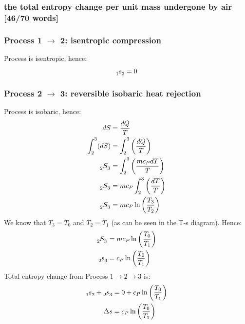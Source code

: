 \documentclass[12pt]{article}
\numberwithin{equation}{section}
\begin{document}
\begin{flushleft}
\subsubsection[Entropy change.]{the total entropy change per unit mass undergone by air [46/70 words]}
\subsubsection*{Process 1 $\rightarrow$ 2: isentropic compression}
Process is isentropic, hence:
\begin{equation}
  \tensor[_1]{s}{_2} = 0
\end{equation}
\subsubsection*{Process 2 $\rightarrow$ 3: reversible isobaric heat rejection}
Process is isobaric, hence:
\begin{align}
  dS &= \frac{dQ}{T}\\
  \int_2^3 (dS) &= \int_2^3 \left(\frac{dQ}{T} \right)\\
  \tensor[_2]{S}{_3} &= \int_2^3 \left(\frac{mc_PdT}{T}\right)\\
  \tensor[_2]{S}{_3} &= mc_P\int_2^3 \left(\frac{dT}{T}\right)\\
  \tensor[_2]{S}{_3} &= mc_P \ln \left( \frac{T_3}{T_2} \right)
\end{align}
We know that $T_3 = T_0$ and $T_2 = T_1$ (as can be seen in the T-s diagram). Hence:
\begin{align}
  \tensor[_2]{S}{_3} &= mc_P \ln \left( \frac{T_0}{T_1} \right)\\
  \tensor[_2]{s}{_3} &= c_P \ln \left( \frac{T_0}{T_1} \right)
\end{align}
Total entropy change from Process $1 \rightarrow 2 \rightarrow 3$ is:
\begin{align}
  \tensor[_1]{s}{_2} + \tensor[_2]{s}{_3} &= 0 + c_P \ln \left( \frac{T_0}{T_1} \right)\\
  \Delta s &= c_P \ln \left( \frac{T_0}{T_1} \right)
\end{align}


\end{flushleft}
\end{document}

